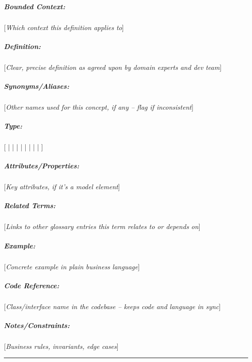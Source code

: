 \subparagraph{Bounded Context:} [\textit{Which context this definition applies to}]

\subparagraph{Definition:} [\textit{Clear, precise definition as agreed upon by domain experts and dev team}]

\subparagraph{Synonyms/Aliases:} [\textit{Other names used for this concept, if any – flag if inconsistent}]

\subparagraph{Type:} [ |  |  |  |  |  |  |  | ]

\subparagraph{Attributes/Properties:} [\textit{Key attributes, if it's a model element}]

\subparagraph{Related Terms:} [\textit{Links to other glossary entries this term relates to or depends on}]

\subparagraph{Example:} [\textit{Concrete example in plain business language}]

\subparagraph{Code Reference:} [\textit{Class/interface name in the codebase – keeps code and language in sync}]

\subparagraph{Notes/Constraints:} [\textit{Business rules, invariants, edge cases}]

\noindent\rule{\textwidth}{0.4pt}


